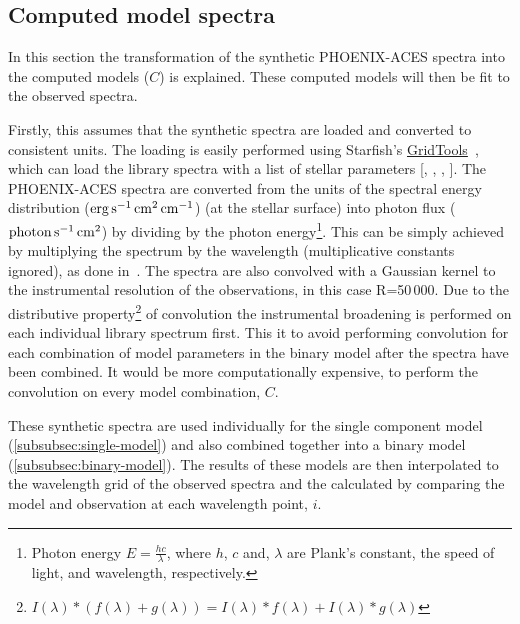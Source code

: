
\subsection{Computed model spectra}
\label{models}
In this section the transformation of the synthetic {PHOENIX-ACES} spectra into the computed models (\(C\)) is explained.
These computed models will then be fit to the observed spectra.

Firstly, this assumes that the synthetic spectra are loaded and converted to consistent units.
The loading is easily performed using Starfish's \href{https://iancze.github.io/Starfish/current/grid_tools.html}{GridTools}~\citep{czekala_constructing_2015}, which can load the library spectra with a list of stellar parameters [\Teff{}, \logg{}, \feh{}, \alphafe{}].
The {PHOENIX-ACES} spectra are converted from the units of the spectral energy distribution (\(\rm erg\,s^{-1}\,cm^{2}\,cm^{-1}\)) (at the stellar surface) into photon flux (\(\rm photon\,s^{-1}\,cm^{2}\)) by dividing by the photon energy\footnote{Photon energy \(E=\frac{hc}{\lambda}\), where \(h\), \(c\) and, \(\lambda\) are Plank's constant, the speed of light, and wavelength, respectively.}.
This can be simply achieved by multiplying the spectrum by the wavelength (multiplicative constants ignored), as done in~\citet{figueira_radial_2016}.
The spectra are also convolved with a Gaussian kernel to the instrumental resolution of the observations, in this case R=50\,000.
Due to the distributive property\footnote{\(I(\lambda) \ast (f(\lambda) + g(\lambda)) = I(\lambda) \ast f(\lambda) + I(\lambda) \ast g(\lambda) \)} of convolution the instrumental broadening is performed on each individual library spectrum first.
This it to avoid performing convolution for each combination of model parameters in the binary model after the spectra have been combined.
It would be more computationally expensive, to perform the convolution on every model combination, \(C\).

These synthetic spectra are used individually for the single component model (\cref{subsubsec:single-model}) and also combined together into a binary model (\cref{subsubsec:binary-model}).
The results of these models are then interpolated to the wavelength grid of the observed spectra and the \textchisquared{} calculated by comparing the model and observation at each wavelength point, \(i\).

